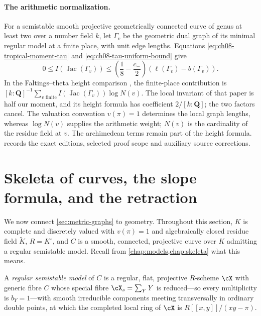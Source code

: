 \paragraph{The arithmetic normalization.}
For a semistable smooth projective geometrically connected curve of
genus at least two over a number field $k$, let $\Gamma_v$ be the
geometric dual graph of its minimal regular model at a finite place,
with unit edge lengths. Equations
\eqref{eq:ch08-tropical-moment-tau} and
\eqref{eq:ch08-tau-uniform-bound} give
\[\tag{8.8j}\label{eq:ch08-tau-height-moment}
 0\leq I(\operatorname{Jac}(\Gamma_v))
   \leq\left(\frac18-\frac{c_-}2\right)(\ell(\Gamma_v)-b(\Gamma_v)).
\]
In the Faltings--theta height comparison
\cite[Theorems~A and~B]{dJS22HeightPublished}, the finite-place
contribution is $[k:\mathbf Q]^{-1}\sum_{v\text{ finite}}
I(\operatorname{Jac}(\Gamma_v))\log N(v)$.
The local invariant of that paper is half our moment, and its
height formula has coefficient $2/[k:\mathbf Q]$; the two factors
cancel. The valuation convention $v(\pi)=1$ determines the local
graph lengths, whereas $\log N(v)$ supplies the arithmetic weight;
$N(v)$ is the cardinality of the residue field at $v$.
The archimedean terms remain part of the height formula.
 records the exact editions,
selected proof scope and auxiliary source corrections.

\section{Skeleta of curves, the slope formula, and the retraction}
\label{sec:ch08-slope-formula}

We now connect \cref{sec:metric-graphs} to geometry.  Throughout this
section, $K$ is complete and discretely valued with $v(\pi)=1$ and
algebraically closed residue field $\widetilde K$, $R=K^\circ$, and $C$ is a
smooth, connected, projective curve over $K$ admitting a regular semistable
model.  Recall from \cref{chap:models,chap:skeleta} what this means.

\begin{definition}
\label{def:ch08-semistable-curve-model}
A \emph{regular semistable model} of $C$ is a regular, flat, projective
$R$-scheme $\cX$ with generic fibre $C$ whose special fibre
$\cX_s=\sum_YY$ is reduced---so every multiplicity is $b_Y=1$---with smooth
irreducible components meeting transversally in ordinary double points, at
which the completed local ring of $\cX$ is $R[[x,y]]/(xy-\pi)$.
\end{definition}

